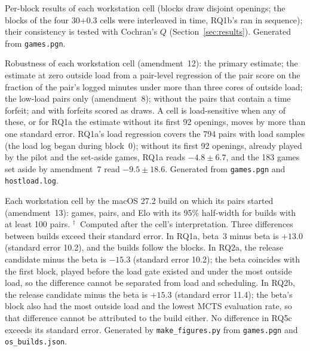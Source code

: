\documentclass{article}
\newif\iffinal
\newif\ifresults
\newcommand{\pending}[1]{\iffinal\PackageError{paper}{Pending content: #1}{Fill it from the artifact before the final build.}\else\textcolor{red}{[PENDING: #1]}\fi}
\begin{document}
\begin{table}[ht]
\centering
\caption{Per-block results of each workstation cell (blocks draw disjoint openings; the blocks of the four 30+0.3 cells were interleaved in time, RQ1b's ran in sequence); their consistency is tested with Cochran's $Q$ (Section~\ref{sec:results}). Generated from \texttt{games.pgn}.}
\label{tab:blocks}
\footnotesize
\ifresults\else{}\fi
\end{table}
\begin{table}[ht]
\centering
\caption{Robustness of each workstation cell (amendment~12): the primary estimate; the estimate at zero outside load from a pair-level regression of the pair score on the fraction of the pair's logged minutes under more than three cores of outside load; the low-load pairs only (amendment~8); without the pairs that contain a time forfeit; and with forfeits scored as draws. A cell is load-sensitive when any of these, or for RQ1a the estimate without its first 92 openings, moves by more than one standard error. RQ1a's load regression covers the 794 pairs with load samples (the load log began during block~0); without its first 92 openings, already played by the pilot and the set-aside games, RQ1a reads $-4.8 \pm 6.7$, and the 183 games set aside by amendment~7 read $-9.5 \pm 18.6$. Generated from \texttt{games.pgn} and \texttt{hostload.log}.}
\label{tab:robustness}
\footnotesize
\ifresults\resizebox{\linewidth}{!}{}\else{}\fi
\end{table}
\begin{table}[ht]
\centering
\caption{Each workstation cell by the macOS 27.2 build on which its pairs started (amendment~13): games, pairs, and Elo with its 95\% half-width for builds with at least 100 pairs. $^\dagger$~Computed after the cell's interpretation. Three differences between builds exceed their standard error. In RQ1a, beta~3 minus beta is $+13.0$ (standard error 10.2), and the builds follow the blocks. In RQ2a, the release candidate minus the beta is $-15.3$ (standard error 10.2); the beta coincides with the first block, played before the load gate existed and under the most outside load, so the difference cannot be separated from load and scheduling. In RQ2b, the release candidate minus the beta is $+15.3$ (standard error 11.4); the beta's block also had the most outside load and the lowest MCTS evaluation rate, so that difference cannot be attributed to the build either. No difference in RQ5c exceeds its standard error. Generated by \texttt{make\_figures.py} from \texttt{games.pgn} and \texttt{os\_builds.json}.}
\label{tab:builds}
\footnotesize
\ifresults\else{}\fi
\end{table}
\end{document}
